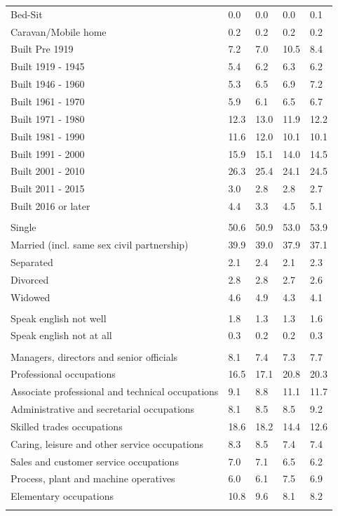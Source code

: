\documentclass{article}
\begin{document}
\begin{table}[h]
\begin{tabular}{KTTTT}
Bed-Sit & 0.0& 0.0& 0.0& 0.1\\
Caravan/Mobile home & 0.2& 0.2& 0.2& 0.2\\
    \hline
Built Pre 1919 &  7.2&  7.0& 10.5&  8.4\\
Built 1919 - 1945 & 5.4& 6.2& 6.3& 6.2\\
Built  1946 - 1960 & 5.3& 6.5& 6.9& 7.2\\
Built  1961 - 1970 & 5.9& 6.1& 6.5& 6.7\\
Built  1971 - 1980 & 12.3& 13.0& 11.9& 12.2\\
Built  1981 - 1990 & 11.6& 12.0& 10.1& 10.1\\
Built  1991 - 2000 & 15.9& 15.1& 14.0& 14.5\\
Built  2001 - 2010 & 26.3& 25.4& 24.1& 24.5\\
Built  2011 - 2015 & 3.0& 2.8& 2.8& 2.7\\
Built  2016 or later & 4.4& 3.3& 4.5& 5.1\\
\hline
    \\
    \hline
Single & 50.6& 50.9& 53.0& 53.9\\
Married (incl. same sex civil partnership) & 39.9& 39.0& 37.9& 37.1\\
Separated  & 2.1& 2.4& 2.1& 2.3\\
Divorced  & 2.8& 2.8& 2.7& 2.6\\
Widowed & 4.6& 4.9& 4.3& 4.1\\
\hline
    \\ 
    \hline
Speak english not well & 1.8& 1.3& 1.3& 1.6\\
Speak english not at all & 0.3& 0.2& 0.2& 0.3\\
\hline
    \\
    \hline
Managers, directors and senior officials & 8.1& 7.4& 7.3& 7.7\\
Professional occupations & 16.5& 17.1& 20.8& 20.3\\
Associate professional and technical occupations &  9.1&  8.8& 11.1& 11.7\\
Administrative and secretarial occupations & 8.1& 8.5& 8.5& 9.2\\
Skilled trades occupations & 18.6& 18.2& 14.4& 12.6\\
Caring, leisure and other service occupations & 8.3& 8.5& 7.4& 7.4\\
Sales and customer service occupations & 7.0& 7.1& 6.5& 6.2\\
Process, plant and machine operatives & 6.0& 6.1& 7.5& 6.9\\
Elementary occupations & 10.8&  9.6&  8.1&  8.2\\
\hline
\end{tabular}
\end{table}
\end{document}
